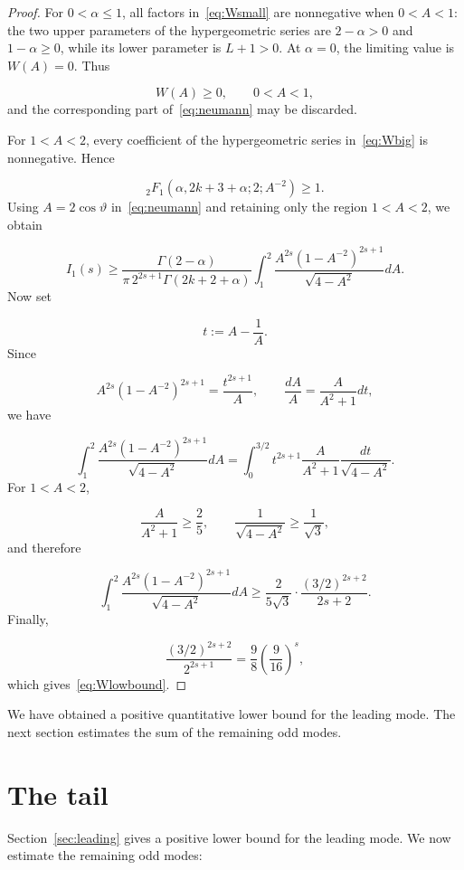 \documentclass[11pt]{article}
\theoremstyle{plain}
\theoremstyle{definition}
\theoremstyle{remark}
\begin{document}
\begin{proof}
For $0 < \alpha \le 1$, all factors in~\eqref{eq:Wsmall} are nonnegative when $0 < A < 1$: the two upper parameters of the hypergeometric series are $2 - \alpha > 0$ and $1 - \alpha \ge 0$, while its lower parameter is $L+1 > 0$. At $\alpha = 0$, the limiting value is $W(A) = 0$. Thus

\[
  W(A) \ge 0 , \qquad  0 < A < 1 ,
\]
and the corresponding part of~\eqref{eq:neumann} may be discarded.

For $1 < A < 2$, every coefficient of the hypergeometric series in~\eqref{eq:Wbig} is nonnegative. Hence

\[
  {}_{2}F_{1}\left( \alpha , 2k+3+\alpha ; 2; A^{-2} \right) \ge 1 .
\]
Using $A = 2\cos \vartheta$ in~\eqref{eq:neumann} and retaining only the region $1 < A < 2$, we obtain

\[
  I_{1}(s) \ge \frac{\Gamma (2-\alpha )}{\pi \, 2^{2s+1}\Gamma (2k+2+\alpha )} \int_{1}^{2} \frac{A^{2s}(1-A^{-2})^{2s+1}}{\sqrt{4-A^{2}}} dA .
\]
Now set

\[
  t := A - \frac{1}{A} .
\]
Since

\[
  A^{2s}(1-A^{-2})^{2s+1} = \frac{t^{2s+1}}{A} , \qquad  \frac{dA}{A} = \frac{A}{A^{2}+1} dt ,
\]
we have

\[
  \int_{1}^{2} \frac{A^{2s}(1-A^{-2})^{2s+1}}{\sqrt{4-A^{2}}} dA = \int_{0}^{3/2} t^{2s+1} \frac{A}{A^{2}+1} \frac{dt}{\sqrt{4-A^{2}}} .
\]
For $1 < A < 2$,

\[
  \frac{A}{A^{2}+1} \ge \frac{2}{5} , \qquad  \frac{1}{\sqrt{4-A^{2}}} \ge \frac{1}{\sqrt{3}} ,
\]
and therefore

\[
  \int_{1}^{2} \frac{A^{2s}(1-A^{-2})^{2s+1}}{\sqrt{4-A^{2}}} dA \ge \frac{2}{5\sqrt{3}} \cdot \frac{(3/2)^{2s+2}}{2s+2} .
\]
Finally,

\[
  \frac{(3/2)^{2s+2}}{2^{2s+1}} = \frac{9}{8} \left( \frac{9}{16} \right)^{s} ,
\]
which gives~\eqref{eq:Wlowbound}.
\end{proof}

We have obtained a positive quantitative lower bound for the leading mode. The next section estimates the sum of the remaining odd modes.


\section{The tail}\label{sec:tail}

Section~\ref{sec:leading} gives a positive lower bound for the leading mode. We now estimate the remaining odd modes:
\end{document}
